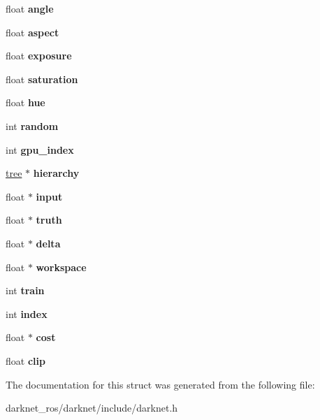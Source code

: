 \begin{DoxyCompactItemize}
\mbox{\label{structnetwork_abe286813534c121ee16da09c258eaf2e}} 
float {\bfseries angle}
\item 
\mbox{\label{structnetwork_acaa88cf6c30100edff5dc061bfb226bb}} 
float {\bfseries aspect}
\item 
\mbox{\label{structnetwork_a609572db2c14c55c6c261844cb33fa12}} 
float {\bfseries exposure}
\item 
\mbox{\label{structnetwork_a9bbb55144a6eca464fbc122f97bf1af8}} 
float {\bfseries saturation}
\item 
\mbox{\label{structnetwork_ae38058a4e1ad0a334026ecbe01f101f4}} 
float {\bfseries hue}
\item 
\mbox{\label{structnetwork_a89dfdaa6178f338c250d7b6631476fa1}} 
int {\bfseries random}
\item 
\mbox{\label{structnetwork_a8ba8b1354e8d018ac74920eb0cd882e8}} 
int {\bfseries gpu\+\_\+index}
\item 
\mbox{\label{structnetwork_a36d6158f07498646e400bf6f7e20a705}} 
\hyperlink{structtree}{tree} $\ast$ {\bfseries hierarchy}
\item 
\mbox{\label{structnetwork_a8f391155a3ceb60caf07d0ee6c6a93f2}} 
float $\ast$ {\bfseries input}
\item 
\mbox{\label{structnetwork_a1453c2cf9a735bde55a281d698797a05}} 
float $\ast$ {\bfseries truth}
\item 
\mbox{\label{structnetwork_a7787a7dde0eea2d91b208c23cdba6286}} 
float $\ast$ {\bfseries delta}
\item 
\mbox{\label{structnetwork_a624719738b94a1d55de651f5dac16b79}} 
float $\ast$ {\bfseries workspace}
\item 
\mbox{\label{structnetwork_a32e7b55fe8dfa07391b6cdce17b4a2c1}} 
int {\bfseries train}
\item 
\mbox{\label{structnetwork_a67a4b2779829a2891b1e3194b4910334}} 
int {\bfseries index}
\item 
\mbox{\label{structnetwork_ac80b4b4eeda5cf4cc4af5c2173d0ad31}} 
float $\ast$ {\bfseries cost}
\item 
\mbox{\label{structnetwork_ac04afd1b20edc7f8734cf2eabe4b57f0}} 
float {\bfseries clip}
\end{DoxyCompactItemize}


The documentation for this struct was generated from the following file\+:\begin{DoxyCompactItemize}
\item 
darknet\+\_\+ros/darknet/include/darknet.\+h\end{DoxyCompactItemize}
